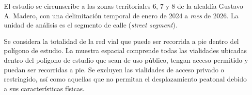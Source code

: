 
El estudio se circunscribe a las zonas territoriales 6, 7 y 8 de la alcaldía Gustavo A. Madero, con una delimitación temporal de enero de 2024 a \textit{mes} de 2026. La unidad de análisis es el segmento de calle (\emph{street segment}).

Se considera la totalidad de la red vial que puede ser recorrida a pie dentro del polígono de estudio. La muestra espacial comprende todas las vialidades ubicadas dentro del polígono de estudio que sean de uso público, tengan acceso permitido y puedan ser recorridas a pie. Se excluyen las vialidades de acceso privado o restringido, así como aquellas que no permitan el desplazamiento peatonal debido a sus características físicas.
